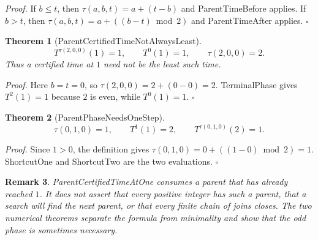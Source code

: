 \documentclass[11pt,letterpaper]{article}
\newtheorem{theorem}{Theorem}
\newtheorem{remark}[theorem]{Remark}
\newenvironment{proof}{\noindent\textit{Proof.}}{\hfill\(\square\)}
\begin{document}
\begin{proof}
If \(b\le t\), then \(\tau(a,b,t)=a+(t-b)\) and ParentTimeBefore applies. If \(b>t\), then \(\tau(a,b,t)=a+((b-t)\bmod 2)\) and ParentTimeAfter applies.
\end{proof}

\begin{theorem}[ParentCertifiedTimeNotAlwaysLeast]
\[
  T^{\tau(2,0,0)}(1)=1,
  \qquad
  T^{0}(1)=1,
  \qquad
  \tau(2,0,0)=2.
\]
Thus a certified time at \(1\) need not be the least such time.
\end{theorem}

\begin{proof}
Here \(b=t=0\), so \(\tau(2,0,0)=2+(0-0)=2\). TerminalPhase gives \(T^{2}(1)=1\) because \(2\) is even, while \(T^{0}(1)=1\).
\end{proof}

\begin{theorem}[ParentPhaseNeedsOneStep]
\[
  \tau(0,1,0)=1,
  \qquad
  T^{1}(1)=2,
  \qquad
  T^{\tau(0,1,0)}(2)=1.
\]
\end{theorem}

\begin{proof}
Since \(1>0\), the definition gives \(\tau(0,1,0)=0+((1-0)\bmod 2)=1\). ShortcutOne and ShortcutTwo are the two evaluations.
\end{proof}

\begin{remark}
ParentCertifiedTimeAtOne consumes a parent that has already reached \(1\). It does not assert that every positive integer has such a parent, that a search will find the next parent, or that every finite chain of joins closes. The two numerical theorems separate the formula from minimality and show that the odd phase is sometimes necessary.
\end{remark}
\end{document}
